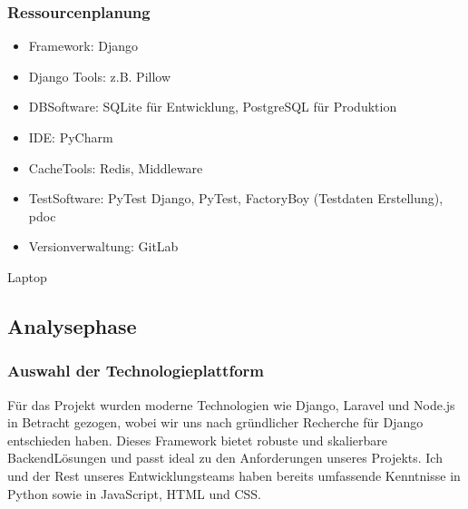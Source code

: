 \documentclass[a4paper,12pt,ngerman]{sphinxmanual}
\begin{document}
\sphinxAtStartPar
{\hyperref[\detokenize{sections/tables:detalierter-zeitplanung}]{}}


\subsubsection{Ressourcenplanung}
\label{\detokenize{sections/projektplanung_analyse:ressourcenplanung}}
\sphinxAtStartPar
{}
\begin{itemize}
\item {} 
\sphinxAtStartPar
Framework: Django

\item {} 
\sphinxAtStartPar
Django Tools: z.B. Pillow

\item {} 
\sphinxAtStartPar
DB\sphinxhyphen{}Software: SQLite für Entwicklung, PostgreSQL für Produktion

\item {} 
\sphinxAtStartPar
IDE: PyCharm

\item {} 
\sphinxAtStartPar
Cache\sphinxhyphen{}Tools: Redis, Middleware

\item {} 
\sphinxAtStartPar
Test\sphinxhyphen{}Software: PyTest Django, PyTest, FactoryBoy (Testdaten Erstellung), pdoc

\item {} 
\sphinxAtStartPar
Versionverwaltung: GitLab

\end{itemize}

\sphinxAtStartPar
{}
\sphinxhyphen{} Laptop


\subsection{Analysephase}
\label{\detokenize{sections/projektplanung_analyse:analysephase}}

\subsubsection{Auswahl der Technologieplattform}
\label{\detokenize{sections/projektplanung_analyse:auswahl-der-technologieplattform}}
\sphinxAtStartPar
Für das Projekt wurden moderne Technologien wie Django, Laravel und Node.js in Betracht gezogen, wobei wir uns nach gründlicher Recherche für Django entschieden haben. Dieses Framework bietet robuste und skalierbare Backend\sphinxhyphen{}Lösungen und passt ideal zu den Anforderungen unseres Projekts. Ich und der Rest unseres Entwicklungsteams haben bereits umfassende Kenntnisse in Python sowie in JavaScript, HTML und CSS.
\end{document}
